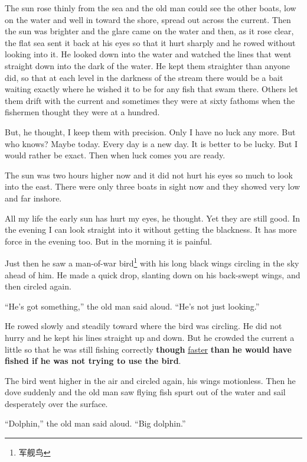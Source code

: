 \documentclass[fontset=ubuntu,zihao=-4]{ctexrep}
\newlength{\drop}%
\begin{document}
The sun rose \gls{thinly} from the sea and the old man could see the other boats,
low on the water and well in \gls{toward} the \gls{shore}, spread out across the
current. Then the sun was brighter and the \gls{glare} came on the water and
then, as it rose clear, the \gls{flat} sea sent it back at his eyes so that it
hurt \gls{sharply} and he rowed without looking into it. He looked down into the
water and watched the lines that went straight down into the dark of the
water. He kept them straighter than anyone did, so that at each level in
the darkness of the stream there would be a bait waiting exactly where he
wished it to be for any fish that swam there. Others let them drift with
the current and sometimes they were at sixty fathoms when the fishermen
thought they were at a hundred.

But, he thought, I keep them with \gls{precision}. Only I have no luck any more.
But who knows? Maybe today. Every day is a new day. It is better to be
lucky. But I would rather be exact. Then when luck comes you are ready.

The sun was two hours higher now and it did not hurt his eyes so much to
look into the east. There were only three boats in \gls{sight} now and they
showed very low and far \gls{inshore}.

All my life the early sun has hurt my eyes, he thought. Yet they are still
good. In the evening I can look straight into it without getting the
blackness. It has more \gls{force} in the evening too. But in the morning it is
\gls{painful}.

Just then he saw a man-of-war bird\footnote{军舰鸟} with his long black
wings circling in the sky \gls{ahead} of him. He made a quick drop,
\gls{slanting} down on his back-swept wings, and then circled again.

``He's got something,'' the old man said aloud. ``He's not just looking.''

He rowed slowly and steadily toward where the bird was circling. He did not
hurry and he kept his lines straight up and down. But he \gls{crowded} the
current a little so that he was still fishing correctly \textbf{though}
\uline{faster} \textbf{than} \textbf{he would have fished if he was not trying
  to use the bird}.

The bird went higher in the air and circled again, his wings
\gls{motionless}. Then he \gls{dove} suddenly and the old man saw flying
fish \gls{spurt} out of the water and sail \gls{desperately} over the surface.

``Dolphin,'' the old man said aloud. ``Big dolphin.''
\end{document}

